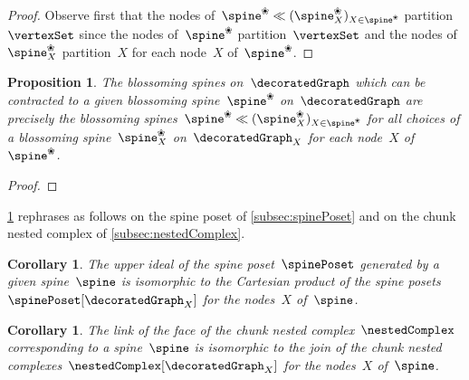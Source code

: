 \documentclass{amsart}
\newtheorem{corollary}[theorem]{Corollary}
\newtheorem{proposition}[theorem]{Proposition}
\theoremstyle{definition}
\newcommand{\vincent}[1]{\todo[color=blue!30]{#1 \\ \hfill --- V.}}
\newcommand{\blossom}{\text{\ding{96}}} %
\newcommand{\insertion}[2]{#1 \ll #2} %
\begin{document}
\begin{proof}
  Observe first that the nodes of~$\insertion{\spine^\blossom}{(\spine^\blossom_X)_{X \in \spine^\blossom}}$ partition~$\vertexSet$ since the nodes of~$\spine^\blossom$ partition~$\vertexSet$ and the nodes of~$\spine^\blossom_X$ partition~$X$ for each node~$X$ of~$\spine^\blossom$.
  \vincent{todo}
\end{proof}

\begin{proposition}
  \label{prop:linksSpines}
  The blossoming spines on~$\decoratedGraph$ which can be contracted to a given blossoming spine~$\spine^\blossom$ on~$\decoratedGraph$ are precisely the blossoming spines~$\insertion{\spine^\blossom}{(\spine^\blossom_X)_{X \in \spine^\blossom}}$ for all choices of a blossoming spine~$\spine^\blossom_X$ on~$\decoratedGraph_X$ for each node~$X$ of~$\spine^\blossom$.
\end{proposition}

\begin{proof}
  \vincent{todo}
\end{proof}

\cref{prop:linksSpines} rephrases as follows on the spine poset of \cref{subsec:spinePoset} and on the chunk nested complex of \cref{subsec:nestedComplex}. %

\begin{corollary}
  \label{coro:linksSpinePoset}
  The upper ideal of the spine poset~$\spinePoset$ generated by a given spine~$\spine$ is isomorphic to the Cartesian product of the spine posets~$\spinePoset[\decoratedGraph_X]$ for the nodes~$X$ of~$\spine$.
\end{corollary}

\begin{corollary}
  \label{coro:linksNestedComplex}
  The link of the face of the chunk nested complex~$\nestedComplex$ corresponding to a spine~$\spine$ is isomorphic to the join of the chunk nested complexes~$\nestedComplex[\decoratedGraph_X]$ for the nodes~$X$ of~$\spine$.
\end{corollary}

\end{document}

